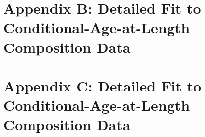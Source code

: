 \documentclass[11pt,
  english,
  a4paper,
]{article}
\begin{document}
\tagmcend\tagstructend

\clearpage


\hypertarget{app-b}{%
\section{Appendix B: Detailed Fit to Conditional-Age-at-Length Composition Data}\label{app-b}}

\leavevmode\tagmcend\tagstructend

\clearpage


\hypertarget{app-c}{%
\section{Appendix C: Detailed Fit to Conditional-Age-at-Length Composition Data}\label{app-c}}

\leavevmode\tagmcend\tagstructend
\end{document}
